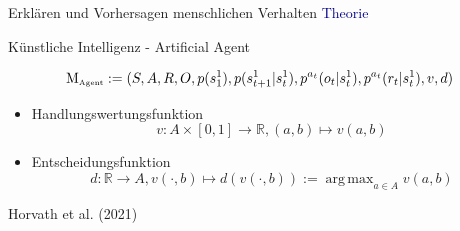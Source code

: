 \documentclass[
  8pt,
  ignorenonframetext,
]{beamer}
\DeclareMathOperator*{\argmax}{arg\,max}
\begin{document}
\begin{frame}{Erklären und Vorhersagen menschlichen Verhalten}
\protect\hypertarget{erkluxe4ren-und-vorhersagen-menschlichen-verhalten-2}{}
\textcolor{darkblue}{Theorie}

Künstliche Intelligenz - Artificial Agent

\begin{equation*}
\mbox{M}_{\mbox{\tiny Agent}}
:= (S,A,R,O,p(s_1^1),p(s_{t+1}^1|s_t^{1}), p^{a_t}(o_t|s_t^1), p^{a_t}(r_t|s_t^1), v, d)
\end{equation*} \vspace{-5mm}

\begin{itemize}
\itemsep2mm
\item Handlungswertungsfunktion
\begin{equation*}
v : A \times [0,1] \to \mathbb{R}, (a,b) \mapsto v(a,b)
\end{equation*}
\item Entscheidungsfunktion
\begin{equation*}
d : \mathbb{R} \to A,  v(\cdot,b) \mapsto d(v(\cdot,b)) := \argmax_{a \in A} v(a,b)
\end{equation*}
\end{itemize}

\flushright
\footnotesize

Horvath et al. (2021)
\end{frame}
\end{document}
